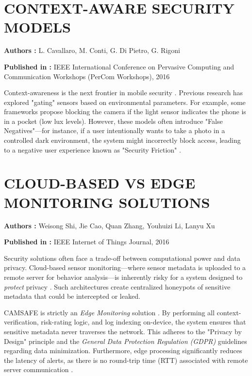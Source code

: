 \documentclass[12pt,a4paper]{report}
\begin{document}
\begin{enumerate}
    \section{CONTEXT-AWARE SECURITY MODELS}

    \textbf{Authors :} L. Cavallaro, M. Conti, G. Di Pietro, G. Rigoni

    \textbf{Published in :} IEEE International Conference on Pervasive Computing and Communication Workshops (PerCom Workshops), 2016

    Context-awareness is the next frontier in mobile security \cite{contextaware}. Previous research has explored "gating" sensors based on environmental parameters. For example, some frameworks propose blocking the camera if the light sensor indicates the phone is in a pocket (low lux levels). However, these models often introduce "False Negatives"—for instance, if a user intentionally wants to take a photo in a controlled dark environment, the system might incorrectly block access, leading to a negative user experience known as "Security Friction" \cite{contextaware}.

    \clearpage
    \section{CLOUD-BASED VS EDGE MONITORING SOLUTIONS}

    \textbf{Authors :} Weisong Shi, Jie Cao, Quan Zhang, Youhuizi Li, Lanyu Xu

    \textbf{Published in :} IEEE Internet of Things Journal, 2016

    Security solutions often face a trade-off between computational power and data privacy. Cloud-based sensor monitoring—where sensor metadata is uploaded to a remote server for behavior analysis—is inherently risky for a system designed to \textit{protect} privacy \cite{edgecomp}. Such architectures create centralized honeypots of sensitive metadata that could be intercepted or leaked.

    CAMSAFE is strictly an \textit{Edge Monitoring} solution \cite{edgecomp}. By performing all context-verification, risk-rating logic, and log indexing on-device, the system ensures that sensitive metadata never traverses the network. This adheres to the "Privacy by Design" principle and the \textit{General Data Protection Regulation (GDPR)} guidelines regarding data minimization. Furthermore, edge processing significantly reduces the latency of alerts, as there is no round-trip time (RTT) associated with remote server communication \cite{edgecomp}.


\end{enumerate}
\end{document}
